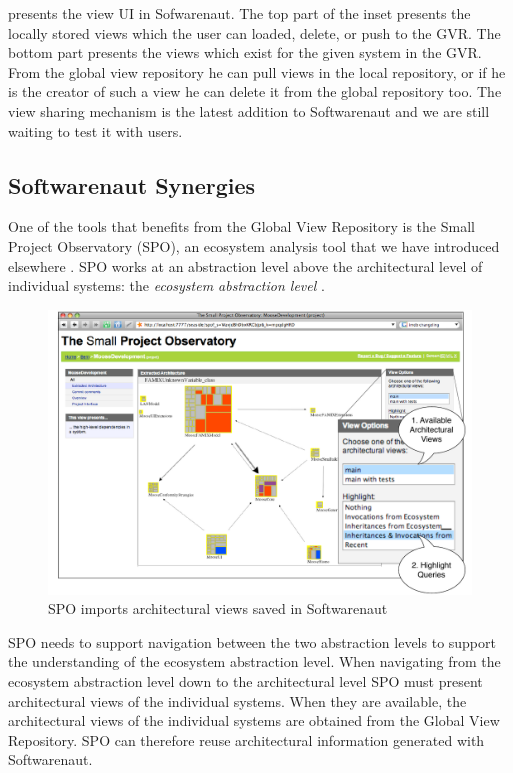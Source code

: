 \documentclass[preprint,12pt]{elsarticle}
\begin{document}
 presents the view UI in Sofwarenaut. The top part of the inset presents the locally stored views which the user can loaded, delete, or push to the GVR. The bottom part presents the views which exist for the given system in the GVR. From the global view repository he can pull views in the local repository, or if he is the creator of such a view he can delete it from the global repository too. The view sharing mechanism is the latest addition to Softwarenaut and we are still waiting to test it with users. 


\subsection {Softwarenaut Synergies}
One of the tools that benefits from the Global View Repository is the Small Project Observatory (SPO), an ecosystem analysis tool that we have introduced elsewhere \cite{lungu-est}. SPO works at an abstraction level above the architectural level of individual systems: the {\em ecosystem abstraction level} \cite{lungu-thesis}. 

\begin{figure}[th!]
\begin{center}
\includegraphics[width=0.7\linewidth]{SpoArchitectural}
\caption{SPO imports architectural views saved in Softwarenaut}
\label{}
\end{center}
\end{figure}


SPO needs to support navigation between the two abstraction levels to support the understanding of  the ecosystem abstraction level. When navigating from the ecosystem abstraction level down to the architectural level SPO must present architectural views of the individual systems. When they are available, the architectural views of the individual systems are obtained from the Global View Repository. SPO can therefore reuse architectural information generated with Softwarenaut.
\end{document}
